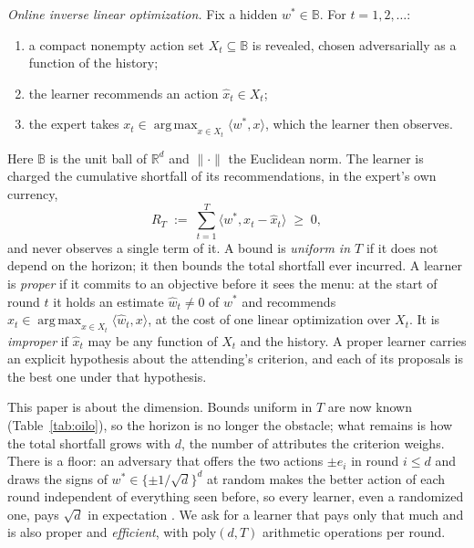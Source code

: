 \documentclass[11pt]{article}
\theoremstyle{plain}
\theoremstyle{definition}
\theoremstyle{remark}
\DeclareMathOperator*{\argmax}{arg\,max}
\newcommand{\R}{\mathbb{R}}
\newcommand{\Ball}{\mathbb{B}}
\newcommand{\wstar}{w^{\ast}}
\newcommand{\ip}[2]{\langle #1, #2\rangle}
\begin{document}
\smallskip
\noindent\textit{Online inverse linear optimization.} Fix a hidden $\wstar\in\Ball$. For
$t=1,2,\dots$:
\begin{enumerate}
\itemsep0pt \parskip0pt 
\item a compact nonempty action set $X_t\subseteq\Ball$ is revealed, chosen adversarially as a
      function of the history;
\item the learner recommends an action $\hat x_t\in X_t$;
\item the expert takes $x_t\in\argmax_{x\in X_t}\ip{\wstar}{x}$, which the learner then observes.
\end{enumerate}
\smallskip

Here $\Ball$ is the unit ball of $\R^{d}$ and $\|\cdot\|$ the Euclidean norm. The learner is charged
the cumulative shortfall of its recommendations, in the expert's own currency,
\begin{equation}\label{eq:regret}
  R_T\;:=\;\sum_{t=1}^{T}\ip{\wstar}{x_t-\hat x_t}\;\ge\;0 ,
\end{equation}
and never observes a single term of it. A bound is \emph{uniform in $T$} if it does not depend on
the horizon; it then bounds the total shortfall ever incurred. A learner is \emph{proper} if it
commits to an objective before it sees the menu: at the start of round $t$ it holds an estimate
$\hat w_t\neq0$ of $\wstar$ and recommends $\hat x_t\in\argmax_{x\in X_t}\ip{\hat w_t}{x}$, at the
cost of one linear optimization over $X_t$. It is \emph{improper} if $\hat x_t$ may be any function
of $X_t$ and the history. A proper learner carries an explicit hypothesis about the attending's
criterion, and each of its proposals is the best one under that hypothesis.

This paper is about the dimension. Bounds uniform in $T$ are now known (Table~\ref{tab:oilo}), so
the horizon is no longer the obstacle; what remains is how the total shortfall grows with $d$, the
number of attributes the criterion weighs. There is a floor: an adversary that offers the two
actions $\pm e_i$ in round $i\le d$ and draws the signs of $\wstar\in\{\pm1/\sqrt d\}^{d}$ at random
makes the better action of each round independent of everything seen before, so every learner,
even a randomized one, pays $\sqrt d$ in expectation \cite{SakaueONS,SakaueMMW}. We ask for a
learner that pays only that much and is also proper and \emph{efficient}, with
$\mathrm{poly}(d,T)$ arithmetic operations per round.
\end{document}
